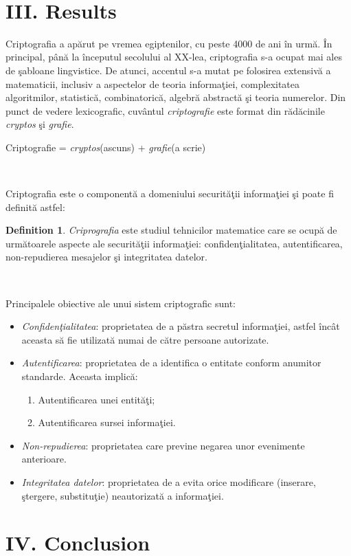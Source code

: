 \documentclass[11pt, a4papper]{report}
\theoremstyle{plain}
\theoremstyle{definition}
\newtheorem{definition}{Definition}
\theoremstyle{definition}
\theoremstyle{proposition}
\begin{document}
\

\newpage

\chapter*{III. Results}


Criptografia a apărut pe vremea egiptenilor, cu peste 4000 de ani în urmă. În principal, până la începutul secolului al XX-lea, criptografia s-a ocupat mai ales de şabloane lingvistice. De atunci, accentul s-a mutat pe folosirea extensivă a matematicii, inclusiv a aspectelor de teoria informaţiei, complexitatea algoritmilor, statistică, combinatorică, algebră abstractă şi teoria numerelor. Din punct de vedere lexicografic, cuvântul \textit{criptografie} este format din rădăcinile \textit{cryptos} şi \textit{grafie}.

\begin{center}
Criptografie = \textit{cryptos}(ascuns) + \textit{grafie}(a scrie)
\end{center}
\

Criptografia este o componentă a domeniului securităţii informaţiei şi poate fi definită astfel:

\begin{definition} \textit{Criprografia} este studiul tehnicilor matematice care se ocupă de următoarele aspecte ale securităţii informaţiei: confidenţialitatea, autentificarea, non-repudierea mesajelor şi integritatea datelor.
\end{definition}
\

Principalele obiective ale unui sistem criptografic sunt:
\begin{itemize}
	\item \textit{Confidenţialitatea}: proprietatea de a păstra secretul informaţiei, astfel încât aceasta să fie utilizată numai de către persoane autorizate.
	\item \textit{Autentificarea}: proprietatea de a identifica o entitate conform anumitor standarde. Aceasta implică:		
	\begin{enumerate}
		\item Autentificarea unei entităţi;
		\item Autentificarea sursei informaţiei.
	\end{enumerate}
	\item \textit{Non-repudierea}: proprietatea care previne negarea unor evenimente anterioare.
	\item \textit{Integritatea datelor}: proprietatea de a evita orice modificare (inserare, ştergere, substituţie) neautorizată a informaţiei.
\
\end{itemize}


\newpage

\chapter*{IV. Conclusion}

\nocite{*}



\end{document}
